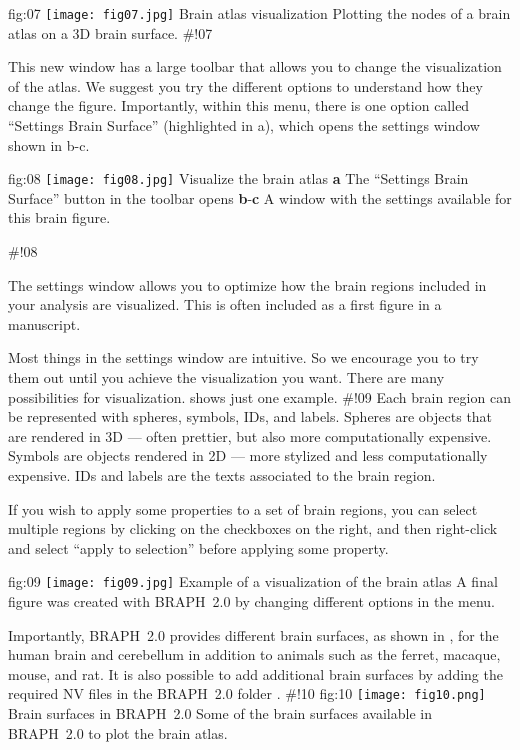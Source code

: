 \documentclass[justified]{tufte-handout}
\begin{document}
	{fig:07}
	{\texttt{[image: fig07.jpg]}}
	{Brain atlas visualization}
	{
	Plotting the nodes of a brain atlas on a 3D brain surface. 
	}
#!07
	
This new window has a large toolbar that allows you to change the visualization of the atlas. We suggest you try the different options to understand how they change the figure. Importantly, within this menu, there is one option called ``Settings Brain Surface'' (highlighted in a), which opens the settings window shown in b-c.

	{fig:08}
	{\texttt{[image: fig08.jpg]}}
	{Visualize the brain atlas}
	{
	{\bf a} The ``Settings Brain Surface'' button in the toolbar opens {\bf b}-{\bf c} A window with the settings available for this brain figure.
	}

#!08

The settings window allows you to optimize how the brain regions included in your analysis are visualized. This is often included as a first figure in a manuscript.

Most things in the settings window are intuitive. So we encourage you to try them out until you achieve the visualization you want. There are many possibilities for visualization.  shows just one example.
#!09
Each brain region can be represented with spheres, symbols, IDs, and labels.
Spheres are objects that are rendered in 3D --- often prettier, but also more computationally expensive.
Symbols are objects rendered in 2D --- more stylized and less computationally expensive.
IDs and labels are the texts associated to the brain region.

If you wish to apply some properties to a set of brain regions, you can select multiple regions by clicking on the checkboxes on the right, and then right-click and select ``apply to selection'' before applying some property.

	{fig:09}
	{\texttt{[image: fig09.jpg]}}
	{Example of a visualization of the brain atlas}
	{
	A final figure was created with BRAPH~2.0 by changing different options in the menu.
	}

Importantly, BRAPH~2.0 provides different brain surfaces, as shown in , for the human brain and cerebellum in addition to animals such as the ferret, macaque, mouse, and rat.
It is also possible to add additional brain surfaces by adding the required NV files in the BRAPH~2.0 folder .
#!10
	{fig:10}
	{\texttt{[image: fig10.png]}}
	{Brain surfaces in BRAPH~2.0}
	{
	Some of the brain surfaces available in BRAPH~2.0 to plot the brain atlas.
	}
\end{document}
